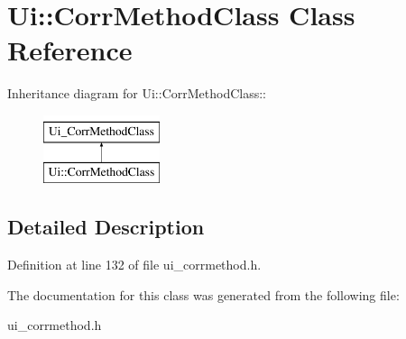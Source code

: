 \hypertarget{classUi_1_1CorrMethodClass}{
\section{Ui::CorrMethodClass Class Reference}
\label{classUi_1_1CorrMethodClass}
}
Inheritance diagram for Ui::CorrMethodClass::\begin{figure}[H]
\begin{center}
\leavevmode
\includegraphics[height=2cm]{classUi_1_1CorrMethodClass}
\end{center}
\end{figure}


\subsection{Detailed Description}


Definition at line 132 of file ui\_\-corrmethod.h.

The documentation for this class was generated from the following file:\begin{DoxyCompactItemize}
\item 
ui\_\-corrmethod.h\end{DoxyCompactItemize}
